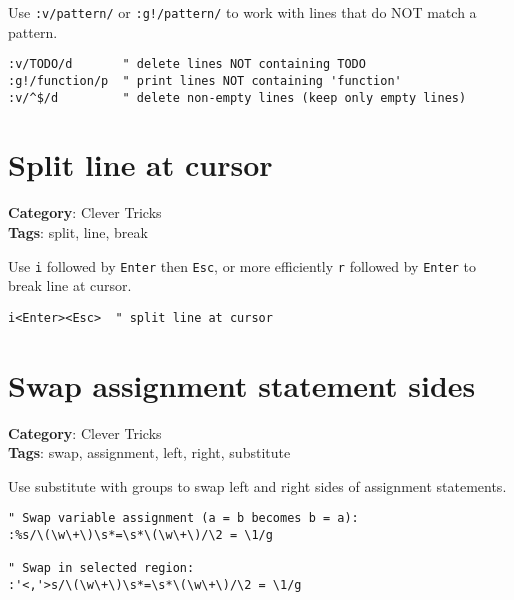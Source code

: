 {{Use {\footnotesize \Verb§:v/pattern/§} or {\footnotesize \Verb§:g!/pattern/§} to work with lines that do NOT match a pattern.

\begin{Exa*}{}
\begin{Verbatim}[fontsize=\footnotesize, breaklines, breakanywhere]
:v/TODO/d       " delete lines NOT containing TODO
:g!/function/p  " print lines NOT containing 'function'
:v/^$/d         " delete non-empty lines (keep only empty lines)
\end{Verbatim}
\end{Exa*}

\section{Split line at cursor}

\textbf{Category}: Clever Tricks\\ \textbf{Tags}: split, line, break
\vspace{0.5cm}

Use {\footnotesize \Verb§i§} followed by {\footnotesize \Verb§Enter§} then {\footnotesize \Verb§Esc§}, or more efficiently {\footnotesize \Verb§r§} followed by {\footnotesize \Verb§Enter§} to break line at cursor.

\begin{Exa*}{}
\begin{Verbatim}[fontsize=\footnotesize, breaklines, breakanywhere]
i<Enter><Esc>  " split line at cursor
\end{Verbatim}
\end{Exa*}

\section{Swap assignment statement sides}

\textbf{Category}: Clever Tricks\\ \textbf{Tags}: swap, assignment, left, right, substitute
\vspace{0.5cm}

Use substitute with groups to swap left and right sides of assignment statements.

\begin{Exa*}{}
\begin{Verbatim}[fontsize=\footnotesize, breaklines, breakanywhere]
" Swap variable assignment (a = b becomes b = a):
:%s/\(\w\+\)\s*=\s*\(\w\+\)/\2 = \1/g

" Swap in selected region:
:'<,'>s/\(\w\+\)\s*=\s*\(\w\+\)/\2 = \1/g
\end{Verbatim}
\end{Exa*}

}}

